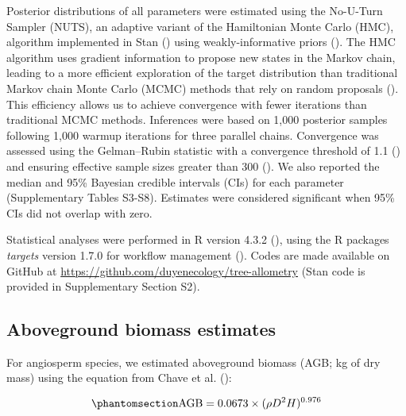 \documentclass[
  12pt,
  letterpaper,
  DIV=11,
  numbers=noendperiod]{scrartcl}
\begin{document}
Posterior distributions of all parameters were estimated using the
No-U-Turn Sampler (NUTS), an adaptive variant of the Hamiltonian Monte
Carlo (HMC), algorithm implemented in Stan
() using
weakly-informative priors (). The HMC algorithm uses gradient information to propose new
states in the Markov chain, leading to a more efficient exploration of
the target distribution than traditional Markov chain Monte Carlo (MCMC)
methods that rely on random proposals
(). This efficiency
allows us to achieve convergence with fewer iterations than traditional
MCMC methods. Inferences were based on 1,000 posterior samples following
1,000 warmup iterations for three parallel chains. Convergence was
assessed using the Gelman--Rubin statistic with a convergence threshold
of 1.1 () and ensuring
effective sample sizes greater than 300
(). We also reported the
median and 95\% Bayesian credible intervals (CIs) for each parameter
(Supplementary Tables S3-S8). Estimates were considered significant when
95\% CIs did not overlap with zero.

Statistical analyses were performed in R version 4.3.2
(), using the R packages
\emph{targets} version 1.7.0 for workflow management
(). Codes are made available on
GitHub at \url{https://github.com/duyenecology/tree-allometry} (Stan
code is provided in Supplementary Section S2).

\subsection{Aboveground biomass
estimates}\label{aboveground-biomass-estimates}

For angiosperm species, we estimated aboveground biomass (AGB; kg of dry
mass) using the equation from Chave et al.
():

\begin{equation}\phantomsection\label{eq-agb}{
\mathrm{AGB} = 0.0673 \times (\rho D^2H)^{0.976}
}\end{equation}
\end{document}
